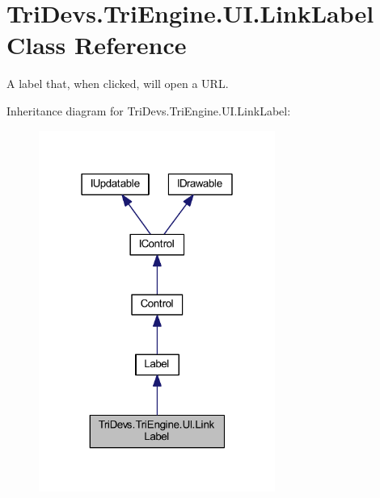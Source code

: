 \hypertarget{class_tri_devs_1_1_tri_engine_1_1_u_i_1_1_link_label}{\section{Tri\-Devs.\-Tri\-Engine.\-U\-I.\-Link\-Label Class Reference}
\label{class_tri_devs_1_1_tri_engine_1_1_u_i_1_1_link_label}
}


A label that, when clicked, will open a U\-R\-L.  




Inheritance diagram for Tri\-Devs.\-Tri\-Engine.\-U\-I.\-Link\-Label\-:
\nopagebreak
\begin{figure}[H]
\begin{center}
\leavevmode
\includegraphics[width=219pt]{class_tri_devs_1_1_tri_engine_1_1_u_i_1_1_link_label__inherit__graph}
\end{center}
\end{figure}


